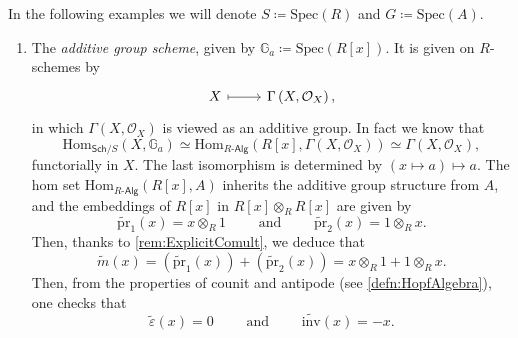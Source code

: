 \begin{ex}\label{ex:AffineGroupSchemesExamples}
	In the following examples we will denote $S \coloneqq \mathrm{Spec}(R)$
	and $G \coloneqq \mathrm{Spec}(A)$.\nopagebreak[4]
	\begin{enumerate}
		\item \label{ex:AdditiveGroupScheme}
		The {\em additive group scheme}, given by 
			$\mathbb{G}_a \coloneqq \mathrm{Spec}(R[x])$.
			It is given on $R$-schemes by
			\begin{equation*}
			\begin{tikzcd}[row sep = 0ex
				,/tikz/column 1/.append style={anchor=base east}
				,/tikz/column 2/.append style={anchor=base west}]
				X \arrow[r, "", mapsto] & 
				\Gamma \left( X , \mathcal{O}_{ X } \right)
			,\end{tikzcd}
			\end{equation*} 
			in which $\Gamma \left( X , \mathcal{O}_{ X } \right)$ is viewed
			as an additive group.
			In fact	we know that
			\begin{equation*}
			\mathrm{Hom}_{\mathsf{Sch}/S} \left( X, \mathbb{G}_a \right) \simeq
			\mathrm{Hom}_{R \text{-}\mathsf{Alg}} 
			\left( R[x], \Gamma \left( X , \mathcal{O}_{ X } \right) \right) \simeq
			\Gamma \left( X , \mathcal{O}_{ X } \right)
			,\end{equation*} 
			functorially in $X$.
			The last isomorphism is determined by 
			$(x \mapsto a) \mapsto a$.
			The hom set 
			$\mathrm{Hom}_{R \text{-}\mathsf{Alg}} \left( R[x], A \right)$
			inherits the additive group structure from $A$, and the embeddings
			of $R[x]$ in $R[x] \otimes_R R[x]$ are given by
			\begin{equation*}
				\widetilde{\mathrm{pr}}_1(x) = x \otimes_R 1
				\qquad \text{ and } \qquad
				\widetilde{\mathrm{pr}}_2(x) = 1 \otimes_R x
			.\end{equation*} 
			Then, thanks to \cref{rem:ExplicitComult},
			we deduce that
			\begin{equation*}
				\widetilde{m}(x) =
				\left( \widetilde{\mathrm{pr}}_1(x) \right) +
				\left( \widetilde{\mathrm{pr}}_2(x) \right) =
				x \otimes_R 1 + 1 \otimes_R x
			.\end{equation*} 
			Then, from the properties of counit and antipode
			(see \cref{defn:HopfAlgebra}), one checks that 
			\begin{equation*}
				\widetilde{\varepsilon}(x) = 0
				\qquad \text{ and } \qquad
				\widetilde{\mathrm{inv}}(x) = -x
			.\end{equation*} 



\end{enumerate}
\end{ex}
